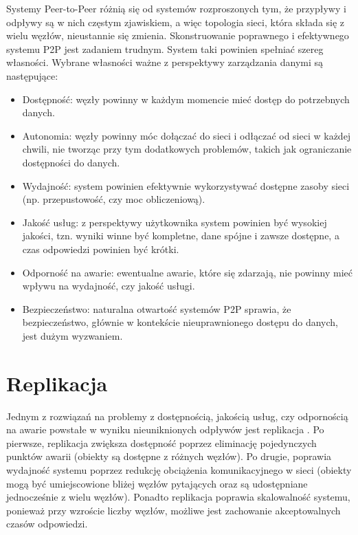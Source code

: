 \documentclass[12pt, twoside, openany]{report}
\begin{document}
Systemy Peer-to-Peer różnią się od systemów rozproszonych tym, że przypływy i odpływy są w nich częstym zjawiskiem, a więc topologia sieci, która składa się z wielu węzłów, nieustannie się zmienia. Skonstruowanie poprawnego i efektywnego systemu P2P jest zadaniem trudnym. System taki powinien spełniać szereg własności. Wybrane własności ważne z perspektywy zarządzania danymi \cite{bib:martins} są następujące:
\begin{itemize}
\item Dostępność: węzły powinny w każdym momencie mieć dostęp do potrzebnych danych.
\item Autonomia: węzły powinny móc dołączać do sieci i odłączać od sieci w każdej chwili, nie tworząc przy tym dodatkowych problemów, takich jak ograniczanie dostępności do danych.
\item Wydajność: system powinien efektywnie wykorzystywać dostępne zasoby sieci (np. przepustowość, czy moc obliczeniową).
\item Jakość usług: z perspektywy użytkownika system powinien być wysokiej jakości, tzn. wyniki winne być kompletne, dane spójne i zawsze dostępne, a czas odpowiedzi powinien być krótki.
\item Odporność na awarie: ewentualne awarie, które się zdarzają, nie powinny mieć wpływu na wydajność, czy jakość usługi.
\item Bezpieczeństwo: naturalna otwartość systemów P2P sprawia, że bezpieczeństwo, głównie w kontekście nieuprawnionego dostępu do danych, jest dużym wyzwaniem.
\end{itemize}

\section{Replikacja}
\label{replikacja}

Jednym z rozwiązań na problemy z dostępnością, jakością usług, czy odpornością na awarie powstałe w wyniku nieuniknionych odpływów jest replikacja \cite{bib:martins}. Po pierwsze, replikacja zwiększa dostępność poprzez eliminację pojedynczych punktów awarii (obiekty są dostępne z różnych węzłów). Po drugie, poprawia wydajność systemu poprzez redukcję obciążenia komunikacyjnego w sieci (obiekty mogą być umiejscowione bliżej węzłów pytających oraz są udostępniane jednocześnie z wielu węzłów). Ponadto replikacja poprawia skalowalność systemu, ponieważ przy wzroście liczby węzłów, możliwe jest zachowanie akceptowalnych czasów odpowiedzi.
\end{document}
